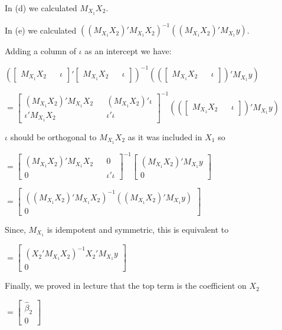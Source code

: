 \documentclass{article}
\begin{document}
\begin{enumerate}[label=\alph*)]
In (d) we calculated $M_{X_1}X_2$.

In (e) we calculated $((M_{X_1}X_2)'M_{X_1}X_2)^{-1}((M_{X_1}X_2)'M_{X_1}y)$.

Adding a column of $\iota$ as an intercept we have:

$(\begin{bmatrix} M_{X_1}X_2 && \iota \end{bmatrix}'\begin{bmatrix} M_{X_1}X_2 && \iota \end{bmatrix})^{-1}((\begin{bmatrix} M_{X_1}X_2 && \iota \end{bmatrix})'M_{X_1}y)$

$= \begin{bmatrix} (M_{X_1}X_2)'M_{X_1}X_2 && (M_{X_1}X_2)'\iota \\ \iota'M_{X_1}X_2 && \iota'\iota\end{bmatrix}^{-1}((\begin{bmatrix} M_{X_1}X_2 && \iota \end{bmatrix})'M_{X_1}y)$

$\iota$ should be orthogonal to $M_{X_1}X_2$ as it was included in $X_1$ so

$= \begin{bmatrix} (M_{X_1}X_2)'M_{X_1}X_2 && 0 \\ 0 && \iota'\iota \end{bmatrix}^{-1}\begin{bmatrix} (M_{X_1}X_2)'M_{X_1}y \\ 0 \end{bmatrix}$

$= \begin{bmatrix} ((M_{X_1}X_2)'M_{X_1}X_2)^{-1}((M_{X_1}X_2)'M_{X_1}y) \\ 0 \end{bmatrix}$

Since, $M_{X_1}$ is idempotent and symmetric, this is equivalent to

$= \begin{bmatrix} (X_2' M_{X_1}X_2)^{-1}X_2' M_{X_1}y \\ 0 \end{bmatrix}$

Finally, we proved in lecture that the top term is the coefficient on $X_2$

$= \begin{bmatrix} \hat{\beta}_2 \\ 0 \end{bmatrix}$


\end{enumerate}
\end{document}
